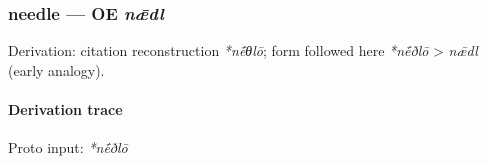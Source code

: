 \documentclass[
  british,
  a4paper,
]{article}
\begin{document}
\subsubsection{\texorpdfstring{needle --- OE
\emph{nǣdl}}{needle --- OE nǣdl}}\label{needle-oe-nux1e3dl}

Derivation: citation reconstruction \emph{*nḗθlō}; form followed here
\emph{*nḗðlō} \textgreater{} \emph{nǣdl} (early analogy).

\paragraph{Derivation trace}\label{derivation-trace-104}

Proto input: \emph{*nḗðlō}

\begingroup
\setlength{\fboxsep}{6pt}
\end{document}

